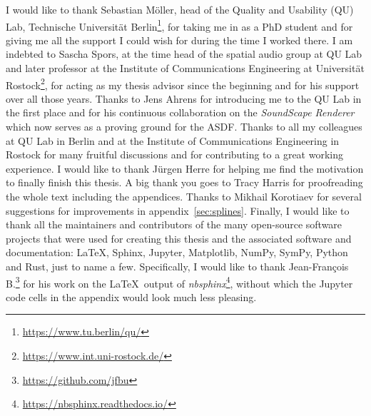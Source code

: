 I would like to thank Sebastian Möller,
head of the Quality and Usability (QU) Lab,
Technische Universität Berlin\footnote{\url{https://www.tu.berlin/qu/}},
for taking me in as a PhD student
and for giving me all the support I could wish for
during the time I worked there.
I am indebted to Sascha Spors,
at the time head of the spatial audio group at QU Lab and later professor
at the Institute of Communications Engineering at Universität
Rostock\footnote{\url{https://www.int.uni-rostock.de/}},
for acting as my thesis advisor since the beginning
and for his support over all those years.
Thanks to Jens Ahrens
for introducing me to the QU Lab in the first place
and for his continuous collaboration on the \emph{SoundScape Renderer}
which now serves as a proving ground for the ASDF.
Thanks to all my colleagues at QU Lab in Berlin
and at the Institute of Communications Engineering in Rostock
for many fruitful discussions
and for contributing to a great working experience.
I would like to thank Jürgen Herre
for helping me find the motivation to finally finish this thesis.
A big thank you goes to
Tracy Harris for proofreading the whole text including the appendices.
Thanks to Mikhail Korotiaev for several suggestions
for improvements in appendix~\ref{sec:splines}.
Finally, I would like to thank all the
maintainers and contributors of the many open-source software projects
that were used for creating this thesis and the associated software and
documentation: \LaTeX, Sphinx, Jupyter, Matplotlib, NumPy, SymPy,
Python and Rust, just to name a few.
Specifically, I would like to thank
Jean-François B.\footnote{\url{https://github.com/jfbu}}
for his work on the \LaTeX\ output of
\emph{nbsphinx}\footnote{\url{https://nbsphinx.readthedocs.io/}},
without which the Jupyter code cells in the appendix would look much
less pleasing.
